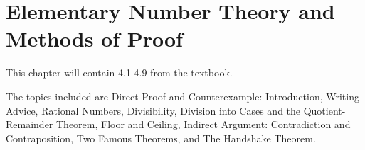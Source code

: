 \documentclass[../discrete.tex]{subfiles}
\begin{document}
\chapter{Elementary Number Theory and Methods of Proof}
This chapter will contain 4.1-4.9 from the textbook.

The topics included are Direct Proof and Counterexample: Introduction, Writing Advice, Rational Numbers, Divisibility, Division into Cases and the Quotient-Remainder Theorem, Floor and Ceiling, Indirect Argument: Contradiction and Contraposition, Two Famous Theorems, and The Handshake Theorem.
\end{document}
